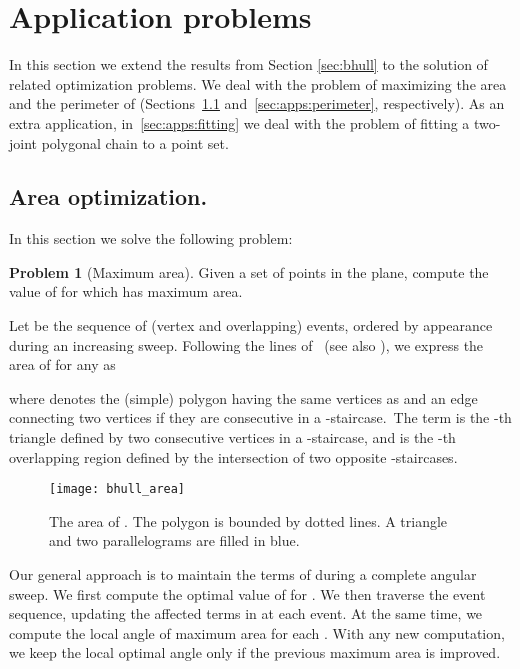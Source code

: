 \documentclass[11pt,letterpaper,english]{article}
\theoremstyle{definition}
\newtheorem{problem}{Problem}
\begin{document}
\section{Application problems}\label{sec:applications}

In this section we extend the results from Section \ref{sec:bhull} to
the solution of related optimization problems. We deal with the
problem of maximizing the area and the perimeter of  (Sections~\ref{sec:apps:area} and~\ref{sec:apps:perimeter}, respectively). As an extra application, in~\ref{sec:apps:fitting} we deal with the
problem of fitting a two-joint polygonal chain to a point set.

\subsection{Area optimization.}\label{sec:apps:area}

In this section we solve the following problem:

\begin{problem}[Maximum area]
  Given a set  of  points in the plane, compute the value of
   for which  has maximum area.
\end{problem}

Let  be the sequence of (vertex
and overlapping) events, ordered by appearance during an increasing
sweep. Following the lines of~\citet{bae_2009} (see also ), we express the area of
 for any  as

where
  denotes the (simple) polygon having the same vertices as  and an edge connecting two vertices if they are
consecutive in a -staircase.~The term  is the -th triangle defined by two consecutive vertices in a -staircase, and  is the -th overlapping region defined by the intersection of two opposite -staircases.


\begin{figure}[ht]
  \centering
  \begin{minipage}{0.9\textwidth}
    \centering
    \texttt{[image: bhull\_area]}
    \caption{The area of . The polygon  is bounded
      by dotted lines. A triangle  and two parallelograms
       are filled in blue.}
    \label{apps:area:fig:area}
  \end{minipage}
\end{figure}

Our general approach is to maintain the terms of
 during a complete angular sweep. We first
compute the optimal value of  for . We then
traverse the event sequence, updating the affected terms in
 at each event. At the same time, we compute
the local angle of maximum area for each . With
any new computation, we keep the local optimal angle only if the
previous maximum area is improved.
\end{document}
